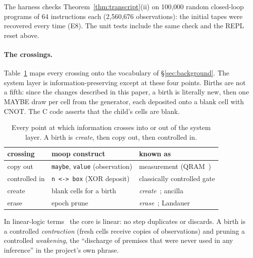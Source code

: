 \documentclass[11pt]{article}
\theoremstyle{definition}
\theoremstyle{remark}
\newcommand{\moop}{\textsf{moop}}
\newcommand{\code}[1]{\texttt{#1}}
\begin{document}
The harness checks Theorem~\ref{thm:transcript}(ii) on 100,000 random
closed-loop programs of 64 instructions each (2,560,676 observations):
the initial tapes were recovered every time (E8). The unit tests include
the same check and the REPL reset above.

\paragraph{The crossings.}
Table~\ref{tab:crossings} maps every crossing onto the vocabulary of
\S\ref{sec:background}. The system layer is information-preserving
except at these four points. Births are not a fifth: since the changes
described in this paper, a birth is literally \textsf{new}, then one
MAYBE draw per cell from the generator, each deposited onto a blank
cell with CNOT. The C code asserts that the child's cells are blank.

\begin{table}[t]
\centering
\small
\begin{tabular}{@{}l l l@{}}
\toprule
crossing & \moop{} construct & known as \\
\midrule
copy out & \code{maybe}, \code{value} (observation) & measurement (QRAM~\cite{knill1996}) \\
controlled in & \code{n <-> box} (XOR deposit) & classically controlled gate \\
create & blank cells for a birth & \emph{create}~\cite{james2012}; ancilla \\
erase & epoch prune & \emph{erase}~\cite{james2012}; Landauer \\
\bottomrule
\end{tabular}
\caption{Every point at which information crosses into or out of the
system layer. A birth is \emph{create}, then copy out, then controlled
in.}
\label{tab:crossings}
\end{table}

In linear-logic terms~\cite{girard1987} the core is linear: no step
duplicates or discards. A birth is a controlled \emph{contraction}
(fresh cells receive copies of observations) and pruning a controlled
\emph{weakening}, the ``discharge of premises that were never used in any
inference'' in the project's own phrase.
\end{document}
